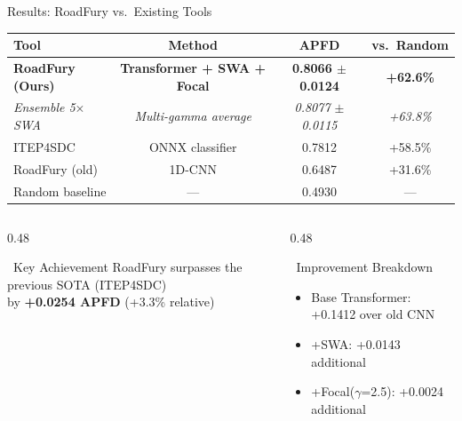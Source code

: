 \documentclass[aspectratio=169, 11pt]{beamer}
\begin{document}
\begin{frame}{Results: RoadFury vs.\ Existing Tools}
\vspace{-0.5em}
\begin{center}
  \renewcommand{\arraystretch}{1.3}
  \small
  \begin{tabular}{l c c c}
    \toprule
    \textbf{Tool} & \textbf{Method} & \textbf{APFD} & \textbf{vs.\ Random} \\
    \midrule
    \rowcolor{successgreen!20}
    \textbf{RoadFury (Ours)} & \textbf{Transformer + SWA + Focal} & \textbf{0.8066 $\pm$ 0.0124} & \textbf{+62.6\%} \\
    \rowcolor{successgreen!8}
    \quad \emph{Ensemble 5$\times$SWA} & \emph{Multi-gamma average} & \emph{0.8077 $\pm$ 0.0115} & \emph{+63.8\%} \\
    \midrule
    ITEP4SDC & ONNX classifier & 0.7812 & +58.5\% \\
    RoadFury (old) & 1D-CNN & 0.6487 & +31.6\% \\
    \midrule
    Random baseline & --- & 0.4930 & --- \\
    \bottomrule
  \end{tabular}
\end{center}

\vspace{0.5em}
\begin{columns}[T]
\begin{column}{0.48\textwidth}
  \begin{exampleblock}{\faCheckCircle\ Key Achievement}
    RoadFury surpasses the previous SOTA (ITEP4SDC)\\
    by \textbf{+0.0254 APFD} (+3.3\% relative)
  \end{exampleblock}
\end{column}
\begin{column}{0.48\textwidth}
  \begin{block}{\faChartBar\ Improvement Breakdown}
    \begin{itemize}
      \item Base Transformer: +0.1412 over old CNN
      \item +SWA: +0.0143 additional
      \item +Focal($\gamma$=2.5): +0.0024 additional
    \end{itemize}
  \end{block}
\end{column}
\end{columns}
\end{frame}
\end{document}
